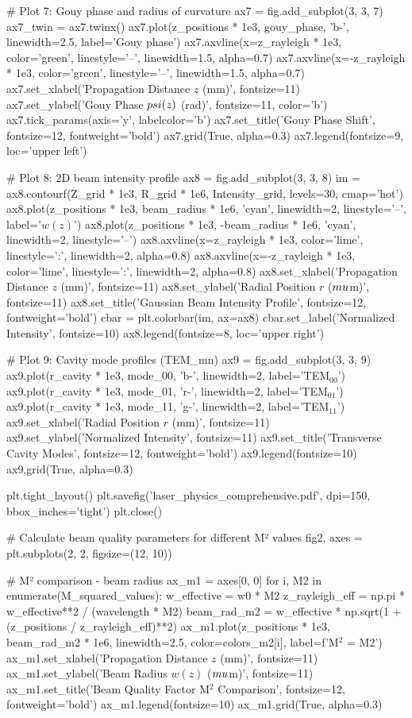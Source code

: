 \documentclass[a4paper, 11pt]{article}
\begin{document}
\begin{pycode}
# Plot 7: Gouy phase and radius of curvature
ax7 = fig.add_subplot(3, 3, 7)
ax7_twin = ax7.twinx()
ax7.plot(z_positions * 1e3, gouy_phase, 'b-', linewidth=2.5, label='Gouy phase')
ax7.axvline(x=z_rayleigh * 1e3, color='green', linestyle='--', linewidth=1.5, alpha=0.7)
ax7.axvline(x=-z_rayleigh * 1e3, color='green', linestyle='--', linewidth=1.5, alpha=0.7)
ax7.set_xlabel('Propagation Distance $z$ (mm)', fontsize=11)
ax7.set_ylabel('Gouy Phase $\\psi(z)$ (rad)', fontsize=11, color='b')
ax7.tick_params(axis='y', labelcolor='b')
ax7.set_title('Gouy Phase Shift', fontsize=12, fontweight='bold')
ax7.grid(True, alpha=0.3)
ax7.legend(fontsize=9, loc='upper left')

# Plot 8: 2D beam intensity profile
ax8 = fig.add_subplot(3, 3, 8)
im = ax8.contourf(Z_grid * 1e3, R_grid * 1e6, Intensity_grid, levels=30, cmap='hot')
ax8.plot(z_positions * 1e3, beam_radius * 1e6, 'cyan', linewidth=2, linestyle='--', label='$w(z)$')
ax8.plot(z_positions * 1e3, -beam_radius * 1e6, 'cyan', linewidth=2, linestyle='--')
ax8.axvline(x=z_rayleigh * 1e3, color='lime', linestyle=':', linewidth=2, alpha=0.8)
ax8.axvline(x=-z_rayleigh * 1e3, color='lime', linestyle=':', linewidth=2, alpha=0.8)
ax8.set_xlabel('Propagation Distance $z$ (mm)', fontsize=11)
ax8.set_ylabel('Radial Position $r$ ($\\mu$m)', fontsize=11)
ax8.set_title('Gaussian Beam Intensity Profile', fontsize=12, fontweight='bold')
cbar = plt.colorbar(im, ax=ax8)
cbar.set_label('Normalized Intensity', fontsize=10)
ax8.legend(fontsize=8, loc='upper right')

# Plot 9: Cavity mode profiles (TEM_mn)
ax9 = fig.add_subplot(3, 3, 9)
ax9.plot(r_cavity * 1e3, mode_00, 'b-', linewidth=2, label='TEM$_{00}$')
ax9.plot(r_cavity * 1e3, mode_01, 'r-', linewidth=2, label='TEM$_{01}$')
ax9.plot(r_cavity * 1e3, mode_11, 'g-', linewidth=2, label='TEM$_{11}$')
ax9.set_xlabel('Radial Position $r$ (mm)', fontsize=11)
ax9.set_ylabel('Normalized Intensity', fontsize=11)
ax9.set_title('Transverse Cavity Modes', fontsize=12, fontweight='bold')
ax9.legend(fontsize=10)
ax9.grid(True, alpha=0.3)

plt.tight_layout()
plt.savefig('laser_physics_comprehensive.pdf', dpi=150, bbox_inches='tight')
plt.close()

# Calculate beam quality parameters for different M² values
fig2, axes = plt.subplots(2, 2, figsize=(12, 10))

# M² comparison - beam radius
ax_m1 = axes[0, 0]
for i, M2 in enumerate(M_squared_values):
    w_effective = w0 * M2
    z_rayleigh_eff = np.pi * w_effective**2 / (wavelength * M2)
    beam_rad_m2 = w_effective * np.sqrt(1 + (z_positions / z_rayleigh_eff)**2)
    ax_m1.plot(z_positions * 1e3, beam_rad_m2 * 1e6, linewidth=2.5,
               color=colors_m2[i], label=f'M$^2$ = {M2}')
ax_m1.set_xlabel('Propagation Distance $z$ (mm)', fontsize=11)
ax_m1.set_ylabel('Beam Radius $w(z)$ ($\\mu$m)', fontsize=11)
ax_m1.set_title('Beam Quality Factor M$^2$ Comparison', fontsize=12, fontweight='bold')
ax_m1.legend(fontsize=10)
ax_m1.grid(True, alpha=0.3)


\end{pycode}
\end{document}
